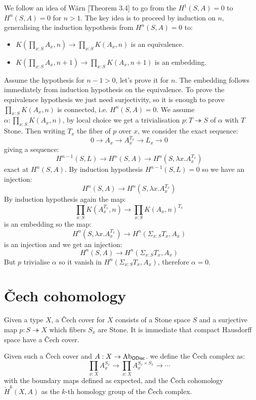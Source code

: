 \documentclass{../util/zariski}
\begin{document}
We follow an idea of Wärn \cite{cech-draft}[Theorem 3.4] to go from the $H^1(S,A)=0$ to $H^n(S,A)=0$ for $n>1$. The key idea is to proceed by induction on $n$, generalising the induction hypothesis from $H^n(S,A) = 0$ to: 
\begin{itemize}
\item $K(\prod_{x:S}A_x,n) \to \prod_{x:S}K(A_x,n)$ is an equivalence.
\item $K(\prod_{x:S}A_x,n+1) \to \prod_{x:S}K(A_x,n+1)$ is an embedding.
\end{itemize}
Assume the hypothesis for $n-1>0$, let's prove it for $n$. The embedding follows immediately from induction hypothesis on the equivalence. To prove the equivalence hypothesis we just need surjectivity, so it is enough to prove $\prod_{x:S}K(A_x,n)$ is connected, i.e. $H^n(S,A)=0$. We assume $\alpha:\prod_{x:S}K(A_x,n)$, by local choice we get a trivialisation $p:T\twoheadrightarrow S$ of $\alpha$ with $T$ Stone. Then writing $T_x$ the fiber of $p$ over $x$, we consider the exact sequence:
\[0\to A_x\to A_x^{T_x}\to L_x\to 0\]
giving a sequence:
\[H^{n-1}(S,L)\to H^n(S,A)\to H^n(S,\lambda x. A_x^{T_x})\]
exact at $H^n(S,A)$. By induction hypothesis $H^{n-1}(S,L) = 0$ so we have an injection:
\[H^n(S,A)\to H^n(S,\lambda x. A_x^{T_x})\]
By induction hypothesis again the map: 
\[\prod_{x:S}K(A_x^{T_x},n)\to \prod_{x:S}K(A_x,n)^{T_x}\]
is an embedding so the map:
\[H^n(S,\lambda x. A_x^{T_x}) \to H^n(\Sigma_{x:S}T_x,A_x)\]
is an injection and we get an injection:
\[H^n(S,A)\to H^n(\Sigma_{x:S}T_x,A_x)\] 
But $p$ trivialise $\alpha$ so it vanish in $H^n(\Sigma_{x:S}T_x,A_x)$, therefore $\alpha=0$.

\section{\v{C}ech cohomology}

Given a type $X$, a \v{C}ech cover for $X$ consists of a Stone space $S$ and a surjective map $p:S\twoheadrightarrow X$ which fibers $S_x$ are Stone. It is immediate that compact Hausdorff space have a \v{C}ech cover.

Given such a \v{C}ech cover and $A:X\to \mathrm{Ab}_{\mathsf{ODisc}}$. we define the \v{C}ech complex as:
\[\prod_{x:X}A_x^{S_x} \to \prod_{x:X}A_x^{S_x\times S_x} \to \cdots\]
with the boundary maps defined as expected, and the \v{C}ech cohomology $\check{H}^k(X,A)$ as the $k$-th homology group of the \v{C}ech complex.
\end{document}
